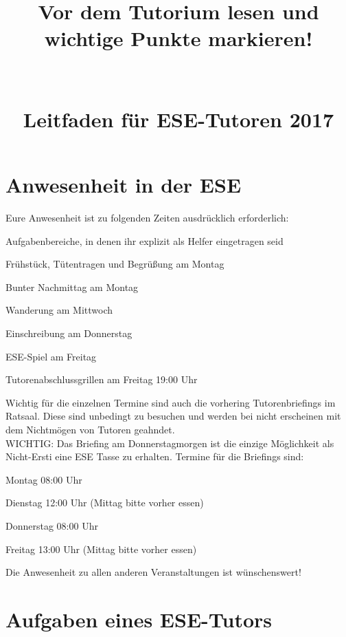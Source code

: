 \documentclass[a4paper,12pt]{report}
\begin{document}
\title{\huge{\textbf{Vor dem Tutorium lesen und wichtige Punkte markieren!}}\\\ \\\ \\{Leitfaden für ESE-Tutoren 2017}}
\date{}
\author{}
\maketitle

\section*{Anwesenheit in der ESE}
Eure Anwesenheit ist zu folgenden Zeiten ausdrücklich erforderlich:
\begin{itemize*}
	\item Aufgabenbereiche, in denen ihr explizit als Helfer eingetragen seid
	\item Frühstück, Tütentragen und Begrüßung am Montag
	\item Bunter Nachmittag am Montag
	\item Wanderung am Mittwoch
	\item Einschreibung am Donnerstag
	\item ESE-Spiel am Freitag
	\item Tutorenabschlussgrillen am Freitag 19:00 Uhr
\end{itemize*}
Wichtig für die einzelnen Termine sind auch die vorhering Tutorenbriefings im Ratsaal. Diese sind unbedingt zu besuchen und werden bei nicht erscheinen mit dem Nichtmögen von Tutoren geahndet.\\
WICHTIG: Das Briefing am Donnerstagmorgen ist die einzige Möglichkeit als Nicht-Ersti eine ESE Tasse zu erhalten.
Termine für die Briefings sind:
\begin{itemize*}
	\item Montag   		08:00 Uhr
	\item Dienstag 		12:00 Uhr (Mittag bitte vorher essen)
	\item Donnerstag	08:00 Uhr
	\item Freitag		13:00 Uhr (Mittag bitte vorher essen)
\end{itemize*}

Die Anwesenheit zu allen anderen Veranstaltungen ist wünschenswert!

\section*{Aufgaben eines ESE-Tutors}
\end{document}
